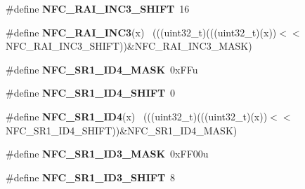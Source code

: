 \begin{DoxyCompactItemize}
\item 
\hypertarget{group___n_f_c___register___masks_ga270c7e97239ac80a0f7125cfd4123204}{}\#define {\bfseries N\+F\+C\+\_\+\+R\+A\+I\+\_\+\+I\+N\+C3\+\_\+\+S\+H\+I\+F\+T}~16\label{group___n_f_c___register___masks_ga270c7e97239ac80a0f7125cfd4123204}

\item 
\hypertarget{group___n_f_c___register___masks_ga70f9ee54bff1ac0fb3ec4c166dc62c77}{}\#define {\bfseries N\+F\+C\+\_\+\+R\+A\+I\+\_\+\+I\+N\+C3}(x)                                                ~(((uint32\+\_\+t)(((uint32\+\_\+t)(x))$<$$<$N\+F\+C\+\_\+\+R\+A\+I\+\_\+\+I\+N\+C3\+\_\+\+S\+H\+I\+F\+T))\&N\+F\+C\+\_\+\+R\+A\+I\+\_\+\+I\+N\+C3\+\_\+\+M\+A\+S\+K)\label{group___n_f_c___register___masks_ga70f9ee54bff1ac0fb3ec4c166dc62c77}

\item 
\hypertarget{group___n_f_c___register___masks_ga4f5458e2c77cae7cbfebca27f335edc1}{}\#define {\bfseries N\+F\+C\+\_\+\+S\+R1\+\_\+\+I\+D4\+\_\+\+M\+A\+S\+K}~0x\+F\+Fu\label{group___n_f_c___register___masks_ga4f5458e2c77cae7cbfebca27f335edc1}

\item 
\hypertarget{group___n_f_c___register___masks_ga1a3119850a91b88e1cf57f35a114ef06}{}\#define {\bfseries N\+F\+C\+\_\+\+S\+R1\+\_\+\+I\+D4\+\_\+\+S\+H\+I\+F\+T}~0\label{group___n_f_c___register___masks_ga1a3119850a91b88e1cf57f35a114ef06}

\item 
\hypertarget{group___n_f_c___register___masks_ga6f8c115525d9da4612db4ede8d6063f6}{}\#define {\bfseries N\+F\+C\+\_\+\+S\+R1\+\_\+\+I\+D4}(x)                                                  ~(((uint32\+\_\+t)(((uint32\+\_\+t)(x))$<$$<$N\+F\+C\+\_\+\+S\+R1\+\_\+\+I\+D4\+\_\+\+S\+H\+I\+F\+T))\&N\+F\+C\+\_\+\+S\+R1\+\_\+\+I\+D4\+\_\+\+M\+A\+S\+K)\label{group___n_f_c___register___masks_ga6f8c115525d9da4612db4ede8d6063f6}

\item 
\hypertarget{group___n_f_c___register___masks_gac367d7fafabe2c88214a79df7b949cf1}{}\#define {\bfseries N\+F\+C\+\_\+\+S\+R1\+\_\+\+I\+D3\+\_\+\+M\+A\+S\+K}~0x\+F\+F00u\label{group___n_f_c___register___masks_gac367d7fafabe2c88214a79df7b949cf1}

\item 
\hypertarget{group___n_f_c___register___masks_ga5c19f376398f7abf353f88adc91171bd}{}\#define {\bfseries N\+F\+C\+\_\+\+S\+R1\+\_\+\+I\+D3\+\_\+\+S\+H\+I\+F\+T}~8\label{group___n_f_c___register___masks_ga5c19f376398f7abf353f88adc91171bd}


\end{DoxyCompactItemize}
